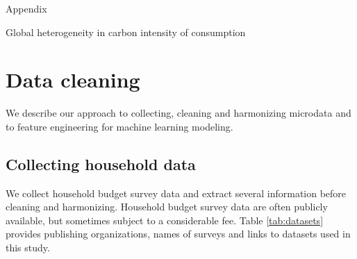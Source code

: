 \documentclass[12pt, a4paper]{article}
\begin{document}
\appendix 
\begin{refsection}
{\Huge Appendix} \label{sec:appendix}

Global heterogeneity in carbon intensity of consumption

\clearpage
\section{Data cleaning} \label{sec:cleaning}

We describe our approach to collecting, cleaning and harmonizing microdata and to feature engineering for machine learning modeling.

\subsection{Collecting household data}

We collect household budget survey data and extract several information before cleaning and harmonizing. Household budget survey data are often publicly available, but sometimes subject to a considerable fee. Table \ref{tab:datasets} provides publishing organizations, names of surveys and links to datasets used in this study.


\end{refsection}
\end{document}
